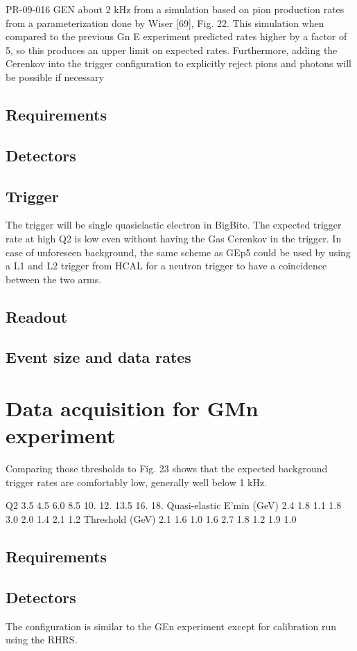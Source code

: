 \documentclass{article}
\begin{document}
PR-09-016 GEN
about 2 kHz from a simulation based on pion production rates from a parameterization done by
Wiser [69], Fig. 22. This simulation when compared to the previous Gn
E experiment predicted rates
higher by a factor of 5, so this produces an upper limit on expected rates. Furthermore, adding the
Cerenkov into the trigger configuration to explicitly reject pions and photons will be possible if
necessary


\subsection{Requirements}
\subsection{Detectors}
\subsection{Trigger}
The trigger will be single quasielastic electron in BigBite.
The expected trigger rate at high Q2 is low even without having the Gas Cerenkov in the trigger.
In case of unforeseen background, the same scheme as GEp5 could be used by using a L1 and L2 trigger from HCAL for a neutron trigger
to have a coincidence between the two arms.
\subsection{Readout}

\subsection{Event size and data rates}
\section{Data acquisition for GMn experiment}
Comparing those thresholds
to Fig. 23 shows that the expected background trigger rates are comfortably low, generally well
below 1 kHz.

Q2 3.5 4.5 6.0 8.5 10. 12. 13.5 16. 18.
Quasi-elastic E’min (GeV) 2.4 1.8 1.1 1.8 3.0 2.0 1.4 2.1 1.2
Threshold (GeV) 2.1 1.6 1.0 1.6 2.7 1.8 1.2 1.9 1.0



\subsection{Requirements}
\subsection{Detectors}
The configuration is similar to the GEn experiment except for calibration run using the RHRS.
\end{document}
